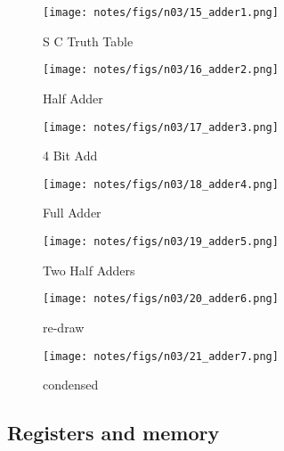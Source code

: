 \documentclass[main.tex]{subfiles}
\begin{document}
\begin{figure}
    \centering
    \texttt{[image: notes/figs/n03/15\_adder1.png]}
    \caption{S C Truth Table}
    \label{fig:15_S_C_truthtable}
\end{figure}

\begin{figure}
    \centering
    \texttt{[image: notes/figs/n03/16\_adder2.png]}
    \caption{Half Adder}
    \label{fig16:half_adder}
\end{figure}

\begin{figure}
    \centering
    \texttt{[image: notes/figs/n03/17\_adder3.png]}
    \caption{4 Bit Add}
    \label{fig17:4_bit_add}
\end{figure}

\begin{figure}
    \centering
    \texttt{[image: notes/figs/n03/18\_adder4.png]}
    \caption{Full Adder}
    \label{fig18:full_adder}
\end{figure}

\begin{figure}
    \centering
    \texttt{[image: notes/figs/n03/19\_adder5.png]}
    \caption{Two Half Adders}
    \label{fig19:two_half_adders}
\end{figure}

\begin{figure}
    \centering
    \texttt{[image: notes/figs/n03/20\_adder6.png]}
    \caption{re-draw}
    \label{fig20:re-draw}
\end{figure}

\begin{figure}
    \centering
    \texttt{[image: notes/figs/n03/21\_adder7.png]}
    \caption{condensed}
    \label{fig21:condensed}
\end{figure}

\subsection{Registers and memory}
\end{document}
